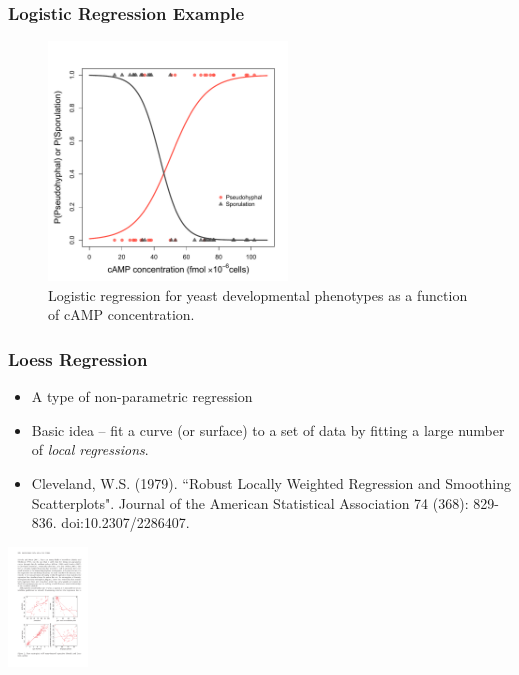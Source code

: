 \documentclass{beamer}
\begin{document}
\begin{frame}
  \frametitle{Logistic Regression Example}
  
\begin{figure}
\begin{center}
\includegraphics[height=2.5in]{cAMP-binary-model}
\end{center}
\caption{Logistic regression for yeast developmental phenotypes as a function of cAMP concentration.}
\end{figure}




\end{frame}




\begin{frame}
  \frametitle{Loess Regression}
  
\begin{itemize}
    \item A type of non-parametric regression
    \item Basic idea -- fit a curve (or surface) to a set of data by fitting a large number of \emph{local regressions}.
    \item Cleveland, W.S. (1979). ``Robust Locally Weighted Regression and Smoothing Scatterplots". Journal of the American Statistical Association 74 (368): 829-836. doi:10.2307/2286407.
\end{itemize}

\begin{center}
\includegraphics[height=1.25in]{loess-example.pdf}
\end{center}  


\end{frame}
\end{document}
